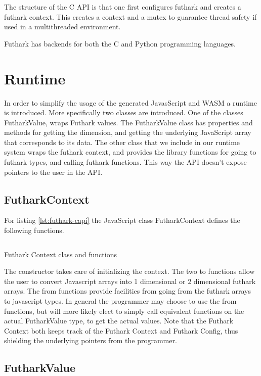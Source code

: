 \documentclass[11pt]{book}
\begin{document}
The structure of the C API is that one first configures futhark and creates a futhark context. This creates a context and a mutex to guarantee thread safety if used in a multithreaded environment.  

Futhark has backends for both the C and Python programming languages. 
\section{Runtime}
In order to simplify the usage of the generated JavasScript and WASM a runtime is introduced. More specifically two classes are introduced. One of the classes FutharkValue, wraps Futhark values. The FutharkValue class has properties and methods for getting the dimension, and getting the underlying JavaScript array that corresponds to its data. The other class that we include in our runtime system wraps the futhark context, and provides the library functions for going to futhark types, and calling futhark functions. This way the API doesn't expose pointers to the user in the API. 


\subsection{FutharkContext}

For listing \ref{lst:futhark-capi} the JavaScript class FutharkContext defines the following functions.

\begin{listing}[H] 
        \inputminted[fontsize=\small,baselinestretch=0.5,linenos]{javascript}{code/compiler/c-backend/libnames.js}
        \caption{Futhark Context class and functions}
        \label{lst:jsapi}    
\end{listing} 
The constructor takes care of initializing the context. The two to functions allow the user to convert Javascript arrays into 1 dimensional or 2 dimensional futhark arrays. The from functions provide facilities from going from the futhark arrays to javascript types. In general the programmer may choose to use the from functions, but will more likely elect to simply call equivalent functions on the actual FutharkValue type, to get the actual values. Note that the Futhark Context both keeps track of the Futhark Context and Futhark Config, thus shielding the underlying pointers from the programmer.


\subsection{FutharkValue}
\end{document}
